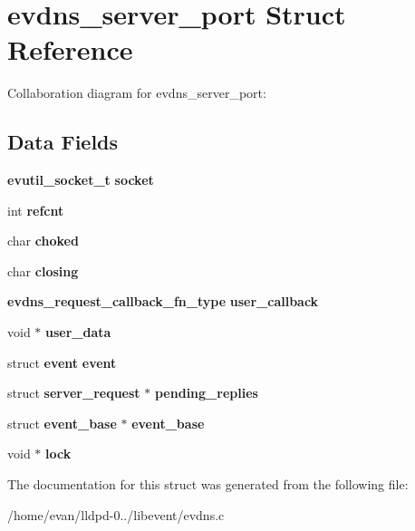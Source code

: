 \section{evdns\-\_\-server\-\_\-port \-Struct \-Reference}
\label{structevdns__server__port}


\-Collaboration diagram for evdns\-\_\-server\-\_\-port\-:
\subsection*{\-Data \-Fields}
\begin{DoxyCompactItemize}
\item 
{\bf evutil\-\_\-socket\-\_\-t} {\bfseries socket}\label{structevdns__server__port_a494e928d7ad4d9e91908c0a553b7bdd9}

\item 
int {\bfseries refcnt}\label{structevdns__server__port_afc0873ec70fe10be301b3ec811a1d6e5}

\item 
char {\bfseries choked}\label{structevdns__server__port_a0f3a154587df2dea392d065f8a09b280}

\item 
char {\bfseries closing}\label{structevdns__server__port_ab7e230398ce08df383866ce33f9dd8da}

\item 
{\bf evdns\-\_\-request\-\_\-callback\-\_\-fn\-\_\-type} {\bfseries user\-\_\-callback}\label{structevdns__server__port_a947d9367c82fedaf23ef51cec32811cc}

\item 
void $\ast$ {\bfseries user\-\_\-data}\label{structevdns__server__port_a0f53d287ac7c064d1a49d4bd93ca1cb9}

\item 
struct {\bf event} {\bfseries event}\label{structevdns__server__port_a1865896e0bd37f9af1e926d9ba93c9dd}

\item 
struct {\bf server\-\_\-request} $\ast$ {\bfseries pending\-\_\-replies}\label{structevdns__server__port_a3969c167822ff643c0fd134d09339271}

\item 
struct {\bf event\-\_\-base} $\ast$ {\bfseries event\-\_\-base}\label{structevdns__server__port_ac1c1d71aa37cb71608f4f802bb85b200}

\item 
void $\ast$ {\bfseries lock}\label{structevdns__server__port_a100fdaedb8eb0d56fd262e7ea2930930}

\end{DoxyCompactItemize}


\-The documentation for this struct was generated from the following file\-:\begin{DoxyCompactItemize}
\item 
/home/evan/lldpd-\/0../libevent/evdns.\-c\end{DoxyCompactItemize}
